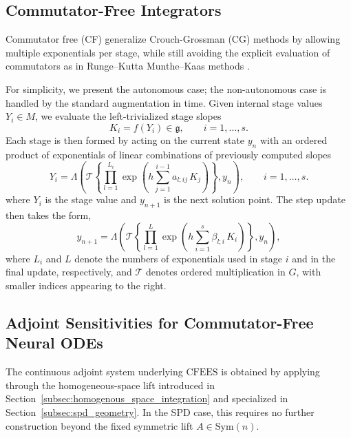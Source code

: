 \documentclass{article}
\theoremstyle{definition}
\theoremstyle{remark}
\begin{document}
\subsection{Commutator-Free Integrators}
Commutator free (CF) \cite{celledoni_commutator-free_2003} generalize Crouch-Grossman (CG) \cite{crouch_numerical_1993} methods by allowing multiple exponentials per stage, while still avoiding the explicit evaluation of commutators as in Runge--Kutta Munthe--Kaas methods \cite{munthe-kaasRungeKuttaMethodsLie1998}.

For simplicity, we present the autonomous case; the non-autonomous case is handled by the standard augmentation in time. Given internal stage values $Y_i \in M$, we evaluate the left-trivialized stage slopes
\begin{equation}
    K_i = f(Y_i) \in \mathfrak{g}, \qquad i=1,\dots,s. \tag{left-trivialized slope}
\end{equation}
Each stage is then formed by acting on the current state $y_n$ with an ordered product of exponentials of linear combinations of previously computed slopes
\begin{equation}
    Y_i
    =
    \Lambda\!\left(
        \mathcal{T}\left\{
            \prod_{l=1}^{L_i}
            \exp\left(
                h \sum_{j=1}^{i-1} a_{l;ij}\,K_j
            \right)
        \right\},
        y_n
    \right),
    \qquad i=1,\dots,s. \tag{stage equation}
\end{equation} 
where $Y_i$ is the stage value and $y_{n+1}$ is the next solution point. The step update then takes the form,
\begin{equation}
    y_{n+1}
    =
    \Lambda\!\left(
        \mathcal{T}\left\{
            \prod_{l=1}^{L}
            \exp\left(
                h \sum_{i=1}^{s} \beta_{l;i}\,K_i
            \right)
        \right\},
        y_n
    \right), \tag{update equation}
\end{equation}
where $L_i$ and $L$ denote the numbers of exponentials used in stage $i$ and in the final update, respectively, and $\mathcal{T}$ denotes ordered multiplication in $G$, with smaller indices appearing to the right.

\subsection{Adjoint Sensitivities for Commutator-Free Neural ODEs}
The continuous adjoint system underlying $\mathrm{CFEES}$ is obtained by applying \citet[Theorem~4.5]{wotte_geometric_2025} through the homogeneous-space lift introduced in Section~\ref{subsec:homogenous_space_integration} and specialized in Section~\ref{subsec:spd_geometry}. In the SPD case, this requires no further construction beyond the fixed symmetric lift $A \in \mathrm{Sym}(n)$.
\end{document}
